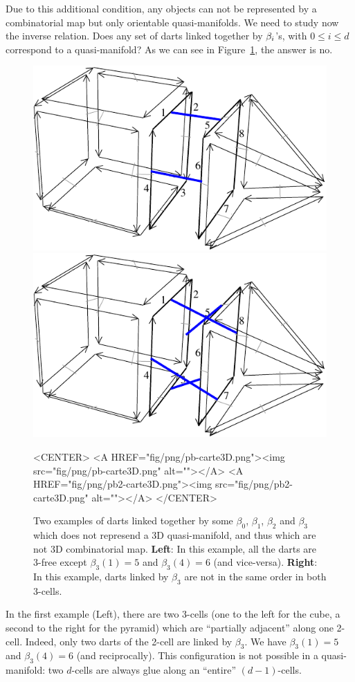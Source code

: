 Due to this additional condition, any objects can not be represented
by a combinatorial map but only orientable quasi-manifolds. We need to
study now the inverse relation. Does any set of darts linked together by
$\beta_{i}$'s, with $0 \leq i \leq d$ correspond to a quasi-manifold?  As
we can see in Figure~\ref{fig-pb-carte}, the answer is no.
%
\begin{figure}[ht]
  \begin{ccTexOnly}
    \begin{center}
      \includegraphics[width=.4\textwidth]
      {Combinatorial_map/fig/pdf/pb-carte3D}
      \qquad
      \includegraphics[width=.4\textwidth]
      {Combinatorial_map/fig/pdf/pb2-carte3D}
    \end{center}
  \end{ccTexOnly}
  \begin{ccHtmlOnly}
    <CENTER>
    <A HREF="fig/png/pb-carte3D.png"><img src="fig/png/pb-carte3D.png" alt=""></A>
    <A HREF="fig/png/pb2-carte3D.png"><img src="fig/png/pb2-carte3D.png" alt=""></A>
    </CENTER>
    \end{ccHtmlOnly}
    \caption{Two examples of darts linked together by some $\beta_0$,
      $\beta_1$, $\beta_2$ and $\beta_3$ which does not represend a 3D
      quasi-manifold, and thus which are not 3D combinatorial map. 
      \textbf{Left}: In this example, all the darts are 3-free except
      $\beta_3(1)=5$ and $\beta_3(4)=6$ (and vice-versa).
      \textbf{Right}: In this example, darts linked by $\beta_3$ 
      are not in the same order in both 3-cells.
    }
    \label{fig-pb-carte}
\end{figure}

In the first example (Left), there are two 3-cells (one to the left
for the cube, a second to the right for the pyramid) which are
``partially adjacent'' along one 2-cell. Indeed, only two darts
of the 2-cell are linked by $\beta_3$. We have $\beta_3(1)=5$ and
$\beta_3(4)=6$ (and reciprocally).  This configuration is not possible
in a quasi-manifold: two $d$-cells are always glue along an ``entire''
$(d-1)$-cells.

